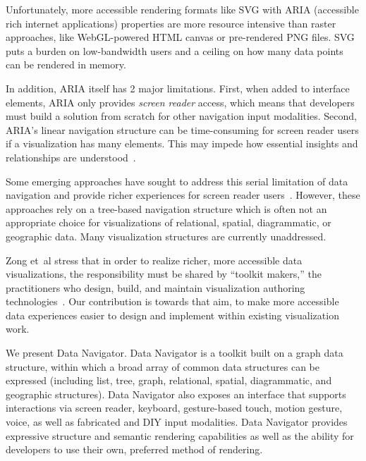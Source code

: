 \documentclass[journal]{vgtc}                %
\newcommand{\ea}{{et~al\xperiod}\xspace}
\begin{document}
Unfortunately, more accessible rendering formats like SVG with ARIA (accessible rich internet applications) properties are more resource intensive than raster approaches, like WebGL-powered HTML canvas or pre-rendered PNG files. SVG puts a burden on low-bandwidth users and a ceiling on how many data points can be rendered in memory.

In addition, ARIA itself has 2 major limitations. First, when added to interface elements, ARIA only provides \textit{screen reader} access, which means that developers must build a solution from scratch for other navigation input modalities. Second, ARIA's linear navigation structure can be time-consuming for screen reader users if a visualization has many elements. This may impede how essential insights and relationships are understood~\cite{Sorge2016Polyfilling,Godfrey2018Accessible,Zong2022Rich,Thompson2023Chart,Jung2022Communicating,Sharif2021Understanding}.

Some emerging approaches have sought to address this serial limitation of data navigation and provide richer experiences for screen reader users~\cite{Sorge2016Polyfilling,Godfrey2018Accessible,Zong2022Rich,Thompson2023Chart}. However, these approaches rely on a tree-based navigation structure which is often not an appropriate choice for visualizations of relational, spatial, diagrammatic, or geographic data. Many visualization structures are currently unaddressed.

Zong \ea stress that in order to realize richer, more accessible data visualizations, the responsibility must be shared by ``toolkit makers,'' the practitioners who design, build, and maintain visualization authoring technologies~\cite{Zong2022Rich}. Our contribution is towards that aim, to make more accessible data experiences easier to design and implement within existing visualization work.

We present Data Navigator. Data Navigator is a toolkit built on a graph data structure, within which a broad array of common data structures can be expressed (including list, tree, graph, relational, spatial, diagrammatic, and geographic structures). Data Navigator also exposes an interface that supports interactions via screen reader, keyboard, gesture-based touch, motion gesture, voice, as well as fabricated and DIY input modalities. Data Navigator provides expressive structure and semantic rendering capabilities as well as the ability for developers to use their own, preferred method of rendering.
\end{document}
